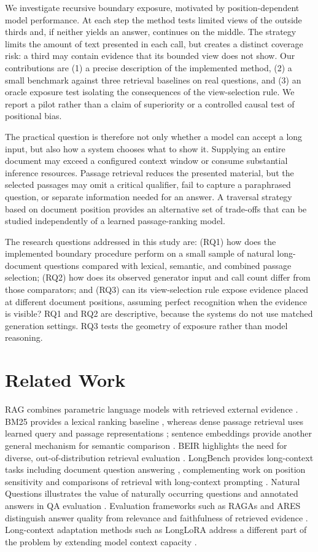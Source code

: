 \documentclass[conference]{IEEEtran}
\begin{document}
We investigate recursive boundary exposure, motivated by position-dependent model performance. At each step the method tests limited views of the outside thirds and, if neither yields an answer, continues on the middle. The strategy limits the amount of text presented in each call, but creates a distinct coverage risk: a third may contain evidence that its bounded view does not show. Our contributions are (1) a precise description of the implemented method, (2) a small benchmark against three retrieval baselines on real questions, and (3) an oracle exposure test isolating the consequences of the view-selection rule. We report a pilot rather than a claim of superiority or a controlled causal test of positional bias.

The practical question is therefore not only whether a model can accept a long input, but also how a system chooses what to show it. Supplying an entire document may exceed a configured context window or consume substantial inference resources. Passage retrieval reduces the presented material, but the selected passages may omit a critical qualifier, fail to capture a paraphrased question, or separate information needed for an answer. A traversal strategy based on document position provides an alternative set of trade-offs that can be studied independently of a learned passage-ranking model.

The research questions addressed in this study are: (RQ1) how does the implemented boundary procedure perform on a small sample of natural long-document questions compared with lexical, semantic, and combined passage selection; (RQ2) how does its observed generator input and call count differ from those comparators; and (RQ3) can its view-selection rule expose evidence placed at different document positions, assuming perfect recognition when the evidence is visible? RQ1 and RQ2 are descriptive, because the systems do not use matched generation settings. RQ3 tests the geometry of exposure rather than model reasoning.

\section{Related Work}
RAG combines parametric language models with retrieved external evidence \cite{lewis}. BM25 provides a lexical ranking baseline \cite{robertson}, whereas dense passage retrieval uses learned query and passage representations \cite{karpukhin}; sentence embeddings provide another general mechanism for semantic comparison \cite{reimers}. BEIR highlights the need for diverse, out-of-distribution retrieval evaluation \cite{beir}. LongBench provides long-context tasks including document question answering \cite{bai}, complementing work on position sensitivity \cite{liu} and comparisons of retrieval with long-context prompting \cite{li}. Natural Questions illustrates the value of naturally occurring questions and annotated answers in QA evaluation \cite{kwiatkowski}. Evaluation frameworks such as RAGAs and ARES distinguish answer quality from relevance and faithfulness of retrieved evidence \cite{ragas,ares}. Long-context adaptation methods such as LongLoRA address a different part of the problem by extending model context capacity \cite{chen}.
\end{document}
